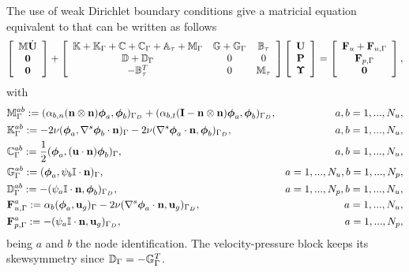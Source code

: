The use of weak Dirichlet boundary conditions give a matricial equation equivalent to  that can be written as follows
\begin{equation}
\label{eq-C7_NSmatform_weak}
\left[\begin{array}{c}
\mathbb{M}\dot{{\bf U}}\\
\mathbf{0}\\
\mathbf{0}
\end{array}\right]+\left[\begin{array}{ccc}
\mathbb{K}+\mathbb{K}_\Gamma+\mathbb{C}+\mathbb{C}_\Gamma+\mathbb{A}_\tau+\mathbb{M}_\Gamma&\mathbb{G}+\mathbb{G}_\Gamma&\mathbb{B}_\tau\\
\mathbb{D}+\mathbb{D}_\Gamma&0&0\\
-\mathbb{B}_\tau^T&0&\mathbb{M}_\tau
\end{array}\right]\left[\begin{array}{c}
{\bf U}\\
{\bf P}\\
\boldsymbol{\Upsilon}
\end{array}\right]=\left[\begin{array}{c}
{\bf F}_u+{\bf F}_{u,\Gamma}\\
{\bf F}_{p,\Gamma}\\
\mathbf{0}
\end{array}\right],
\end{equation}
with 
\begin{align*}
&\mathbb{M}_{\Gamma}^{ab}:=(\alpha_{b,n}({\bf n}\otimes{\bf n})\boldsymbol{\phi}_{a},\boldsymbol{\phi}_{b})_{\Gamma_D}+(\alpha_{b,t}(\mathbf{I}-{\bf n}\otimes{\bf n})\boldsymbol{\phi}_{a},\boldsymbol{\phi}_{b})_{\Gamma_D},&a,b=1,...,N_u,\\
&\mathbb{K}_{\Gamma}^{ab}:=-2\nu(\boldsymbol{\phi}_{a},\nabla^s\boldsymbol{\phi}_{b}\cdot{\bf n})_\Gamma-2\nu(\nabla^s\boldsymbol{\phi}_{a}\cdot{\bf n},\boldsymbol{\phi}_{b})_{\Gamma_D},&a,b=1,...,N_u,\\
&\mathbb{C}_{\Gamma}^{ab}:=\frac{1}{2}(\boldsymbol{\phi}_{a},({\bf u}\cdot{\bf n})\boldsymbol{\phi}_{b})_\Gamma,&a,b=1,...,N_u,\\
&\mathbb{G}_{\Gamma}^{ab}:=(\boldsymbol{\phi}_{a},\psi_{b}\mathbb{I}\cdot{\bf n})_\Gamma,&a=1,...,N_u,b=1,...,N_p,\\
&\mathbb{D}_{\Gamma}^{ab}:=-(\psi_{a}\mathbb{I}\cdot{\bf n},\boldsymbol{\phi}_{b})_{\Gamma_D},&a=1,...,N_p,b=1,...,N_u,\\
&{\bf F}_{u,\Gamma}^{a}:=\alpha_b(\boldsymbol{\phi}_{a},{\bf u}_g)_\Gamma-2\nu(\nabla^s\boldsymbol{\phi}_{a}\cdot{\bf n},{\bf u}_g)_{\Gamma_D},&a=1,...,N_u,\\
&{\bf F}_{p,\Gamma}^{a}:=-(\psi_{a}\mathbb{I}\cdot{\bf n},{\bf u}_g)_{\Gamma_D},&a=1,...,N_p,
\end{align*}
being $a$ and $b$ the node identification. The velocity-pressure block keeps its skewsymmetry since $\mathbb{D}_\Gamma=-\mathbb{G}_\Gamma^T$.

